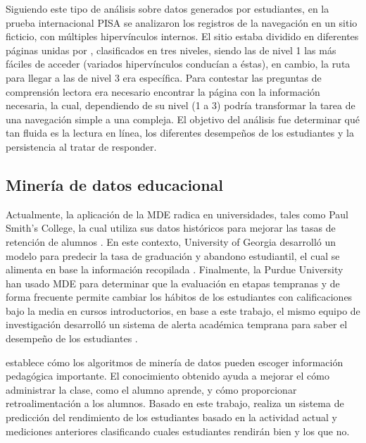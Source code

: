 Siguiendo este tipo de análisis sobre datos generados por estudiantes, en la prueba internacional PISA \parencite{PISA} se analizaron los registros de la navegación en un sitio  ficticio, con múltiples hipervínculos internos. El sitio estaba dividido en diferentes páginas unidas por , clasificados en tres niveles, siendo las de nivel 1 las más fáciles de acceder (variados hipervínculos conducían a éstas), en cambio, la ruta para llegar a las de nivel 3 era específica. Para contestar las preguntas de comprensión lectora era necesario encontrar la página con la información necesaria, la cual, dependiendo de su nivel (1 a 3) podría transformar la tarea de una navegación simple a una compleja. El objetivo del análisis fue determinar qué tan fluida es la lectura en línea, los diferentes desempeños de los estudiantes y la persistencia al tratar de responder.


\subsection{Minería de datos educacional}


Actualmente, la aplicación de la MDE radica en universidades, tales como Paul Smith’s College, la cual utiliza sus datos históricos para mejorar las tasas de retención de alumnos \parencite{bichsel2012analytics}. En este contexto, University of Georgia desarrolló un modelo para predecir la tasa de graduación y abandono estudiantil, el cual se alimenta en base la información recopilada \parencite{morris2005predicting}. Finalmente, la Purdue University han usado MDE para determinar que la evaluación en etapas tempranas y de forma frecuente permite cambiar los hábitos de los estudiantes con calificaciones bajo la media en cursos introductorios, en base a este trabajo, el mismo equipo de investigación desarrolló un sistema de alerta académica temprana para saber el desempeño de los estudiantes \parencite{baepler2010academic}. 

\textcite{merceron2005educational} establece cómo los algoritmos de minería de datos pueden escoger información pedagógica importante. El conocimiento obtenido ayuda a mejorar el cómo administrar la clase, como el alumno aprende, y cómo proporcionar retroalimentación a los alumnos. Basado en este trabajo, \textcite{abdullah2014students} realiza un sistema de predicción del rendimiento de los estudiantes basado en la actividad actual y mediciones anteriores clasificando cuales estudiantes rendirán bien y los que no. 


